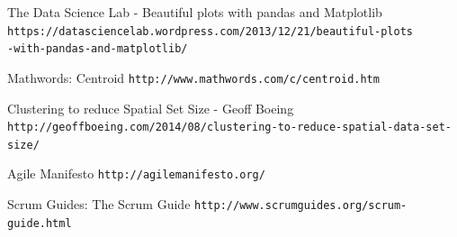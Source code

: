 \documentclass[12pt,a4paper,openright,oneside]{article}
\numberwithin{equation}{section}
\theoremstyle{definition}
\begin{document}
\begin{thebibliography}{50}
 The Data Science Lab - Beautiful plots with pandas and Matplotlib
\newline \texttt{https://datasciencelab.wordpress.com/2013/12/21/beautiful-plots\\-with-pandas-and-matplotlib/}

 Mathwords: Centroid
\newline \texttt{http://www.mathwords.com/c/centroid.htm}

 Clustering to reduce Spatial Set Size - Geoff Boeing
\newline \texttt{http://geoffboeing.com/2014/08/clustering-to-reduce-spatial-data-set-size/}

 Agile Manifesto
\newline \texttt{http://agilemanifesto.org/}

 Scrum Guides: The Scrum Guide
\newline \texttt{http://www.scrumguides.org/scrum-guide.html}



















\end{thebibliography}
\end{document}
